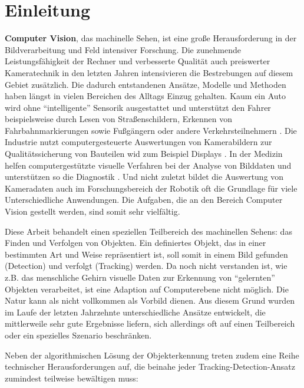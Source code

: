 \section{Einleitung}
\textbf{Computer Vision}, das machinelle Sehen, ist eine große Herausforderung in der Bildverarbeitung und Feld intensiver Forschung. Die zunehmende Leistungsfähigkeit der Rechner und verbesserte Qualität auch preiswerter Kameratechnik in den letzten Jahren intensivieren die Bestrebungen auf diesem Gebiet zusätzlich. Die dadurch entstandenen Ansätze, Modelle und Methoden haben längst in vielen Bereichen des Alltags Einzug gehalten. Kaum ein Auto wird ohne ``intelligente'' Sensorik ausgestattet und unterstützt den Fahrer beispielsweise durch Lesen von Straßenschildern, Erkennen von Fahrbahnmarkierungen sowie Fußgängern oder andere Verkehrsteilnehmern \cite{PED}. Die Industrie nutzt computergesteuerte Auswertungen von Kamerabildern zur Qualitätssicherung von Bauteilen wid zum Beispiel Displays \cite{LCD}. In der Medizin helfen computergestützte visuelle Verfahren bei der Analyse von Bilddaten und unterstützen so die Diagnostik \cite{MIP}. Und nicht zuletzt bildet die Auswertung von Kameradaten auch im Forschungsbereich der Robotik oft die Grundlage für viele Unterschiedliche Anwendungen. Die Aufgaben, die an den Bereich Computer Vision gestellt werden, sind somit sehr vielfältig.

Diese Arbeit behandelt einen speziellen Teilbereich des machinellen Sehens: das Finden und Verfolgen von Objekten. Ein definiertes Objekt, das in einer bestimmten Art und Weise repräsentiert ist, soll somit in einem Bild gefunden (Detection) und verfolgt (Tracking) werden. Da noch nicht verstanden ist, wie z.B. das menschliche Gehirn visuelle Daten zur Erkennung von ``gelernten'' Objekten verarbeitet, ist eine Adaption auf Computerebene nicht möglich. Die Natur kann als nicht vollkommen als Vorbild dienen. Aus diesem Grund wurden im Laufe der letzten Jahrzehnte unterschiedliche Ansätze entwickelt, die mittlerweile sehr gute Ergebnisse liefern, sich allerdings oft auf einen Teilbereich oder ein spezielles Szenario beschränken.

Neben der algorithmischen Lösung der Objekterkennung treten zudem eine Reihe technischer Herausforderungen auf, die beinahe jeder Tracking-Detection-Ansatz zumindest teilweise bewältigen muss: 

